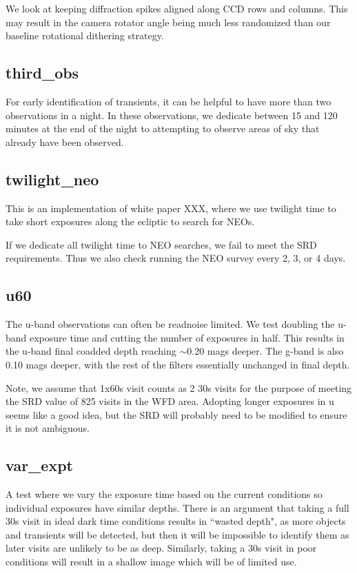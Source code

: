 We look at keeping diffraction spikes aligned along CCD rows and columns. This may result in the camera rotator angle being much less randomized than our baseline rotational dithering strategy.

\subsection{third\_obs}

For early identification of transients, it can be helpful to have more than two observations in a night. In these observations, we dedicate between 15 and 120 minutes at the end of the night to attempting to observe areas of sky that already have been observed.

\subsection{twilight\_neo}

This is an implementation of white paper XXX, where we use twilight time to take short exposures along the ecliptic to search for NEOs. 

If we dedicate all twilight time to NEO searches, we fail to meet the SRD requirements. Thus we also check running the NEO survey every 2, 3, or 4 days.

\subsection{u60}\label{ss:u60}
The u-band observations can often be readnoise limited. We test doubling the u-band exposure time and cutting the number of exposures in half. This results in the u-band final coadded depth reaching $\sim$0.20 mags deeper. The g-band is also 0.10 mags deeper, with the rest of the filters essentially unchanged in final depth.

Note, we assume that 1x60s visit counts as 2 30s visits for the purpose of meeting the SRD value of 825 visits in the WFD area. Adopting longer exposures in u seems like a good idea, but the SRD will probably need to be modified to ensure it is not ambiguous.

\subsection{var\_expt}

A test where we vary the exposure time based on the current conditions so individual exposures have similar depths. There is an argument that taking a full 30s visit in ideal dark time conditions results in ``wasted depth", as more objects and transients will be detected, but then it will be impossible to identify them as later visits are unlikely to be as deep. Similarly, taking a 30s visit in poor conditions will result in a shallow image which will be of limited use.

